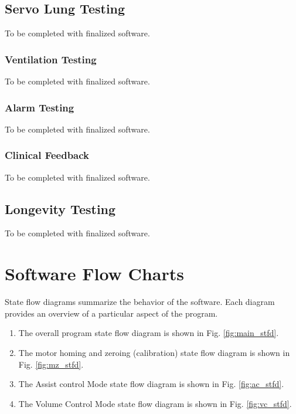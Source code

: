 \documentclass[]{article}
\begin{document}
\subsection{Servo Lung Testing}

To be completed with finalized software.


\subsubsection{Ventilation Testing}

To be completed with finalized software.


\subsubsection{Alarm Testing}

To be completed with finalized software.

\subsubsection{Clinical Feedback}

To be completed with finalized software.

\subsection{Longevity Testing}

To be completed with finalized software.



\appendix

\section{Software Flow Charts}
\label{app:sfd}

State flow diagrams summarize the behavior of the software.  Each diagram provides an overview of a particular aspect of the program.
\begin{enumerate}
	\item The overall program state flow diagram is shown in Fig. \ref{fig:main_stfd}.
	\item The motor homing and zeroing (calibration) state flow diagram is shown in Fig. \ref{fig:mz_stfd}.
	\item The Assist control Mode state flow diagram is shown in Fig. \ref{fig:ac_stfd}.
	\item The Volume Control Mode state flow diagram is shown in Fig. \ref{fig:vc_stfd}.
\end{enumerate}
\end{document}
